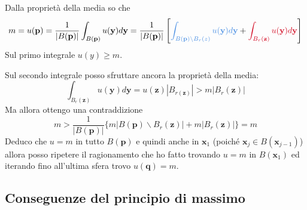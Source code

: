 \documentclass[10pt,a4paper,twoside,openright]{book}
\newcommand{\x}{\mathbf{x}}
\newcommand{\y}{\mathbf{y}}
\begin{document}
\begin{dimostrazione}
	Dalla proprietà della media so che 
	\begin{equation*}
	m=u( \mathbf{p}) =\frac{1}{| B( \mathbf{p})| }\int _{B( \mathbf{p})} u(\y) d\y=\frac{1}{| B( \mathbf{p})| }\left[\textcolor[rgb]{0.29,0.56,0.89}{\int _{B( \mathbf{p}) \backslash B_{r}( z)} u(\y) d\y} +\textcolor[rgb]{0.82,0.01,0.11}{\int _{B_{r}( \mathbf{z})} u(\y) d\y}\right]
	\end{equation*}
	Sul primo integrale $u( y) \geqslant m$.

	Sul secondo integrale posso sfruttare ancora la proprietà della media:
	\begin{equation*}
		\int _{B_{r}(\mathbf{z})} u(\y) d\y=u(\mathbf{z})| B_{r(\mathbf{z})}|  >m| B_{r}(\mathbf{z})| 
	\end{equation*}
	Ma allora ottengo una contraddizione
	\begin{equation*}
		m >\frac{1}{| B(\mathbf{p})| }\{m| B(\mathbf{p}) \backslash B_{r}(\mathbf{z})| +m| B_{r}(\mathbf{z})| \} =m
	\end{equation*}
	Deduco che $u=m$ in tutto $B(\mathbf{p})$ e quindi anche in $\x_{1}$ (poiché $\x_{j} \in B(\x_{j-1})$) allora posso ripetere il ragionamento che ho fatto trovando $u=m$ in $B(\x_{1})$ ed iterando fino all'ultima sfera trovo $u(\mathbf{q}) =m$.
\end{dimostrazione}
\subsection{Conseguenze del principio di massimo}
\end{document}
